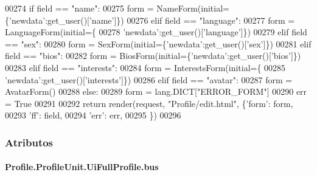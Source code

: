 \begin{DoxyCode}
00274                 \textcolor{keywordflow}{if}   field == \textcolor{stringliteral}{"name"}:
00275                     form = NameForm(initial=\{\textcolor{stringliteral}{'newdata'}:get\_user()[\textcolor{stringliteral}{'name'}]\})
00276                 \textcolor{keywordflow}{elif} field == \textcolor{stringliteral}{"language"}:
00277                     form = LanguageForm(initial=\{
00278                             \textcolor{stringliteral}{'newdata'}:get\_user()[\textcolor{stringliteral}{'language'}]\})
00279                 \textcolor{keywordflow}{elif} field == \textcolor{stringliteral}{"sex"}:
00280                     form = SexForm(initial=\{\textcolor{stringliteral}{'newdata'}:get\_user()[\textcolor{stringliteral}{'sex'}]\})
00281                 \textcolor{keywordflow}{elif} field == \textcolor{stringliteral}{"bios"}:
00282                     form = BiosForm(initial=\{\textcolor{stringliteral}{'newdata'}:get\_user()[\textcolor{stringliteral}{'bios'}]\})
00283                 \textcolor{keywordflow}{elif} field == \textcolor{stringliteral}{"interests"}:
00284                     form = InterestsForm(initial=\{
00285                             \textcolor{stringliteral}{'newdata'}:get\_user()[\textcolor{stringliteral}{'interests'}]\})
00286                 \textcolor{keywordflow}{elif} field == \textcolor{stringliteral}{"avatar"}:
00287                     form = AvatarForm()
00288                 \textcolor{keywordflow}{else}:
00289                     form = lang.DICT[\textcolor{stringliteral}{"ERROR\_FORM"}]
00290                     err = \textcolor{keyword}{True} 
00291 
00292                 \textcolor{keywordflow}{return} render(request, \textcolor{stringliteral}{"Profile/edit.html"}, \{\textcolor{stringliteral}{'form'}: form,
00293                                                              \textcolor{stringliteral}{'ff'}: field,
00294                                                              \textcolor{stringliteral}{'err'}: err,
00295                                                             \})
00296         

\end{DoxyCode}


\subsubsection{Atributos}
\hypertarget{classProfile_1_1ProfileUnit_1_1UiFullProfile_a47049f3f61c7fada93dd84fccd19a2bd}{
\paragraph[{bus}]{\setlength{\rightskip}{0pt plus 5cm}Profile.\-Profile\-Unit.\-Ui\-Full\-Profile.\-bus}}\label{classProfile_1_1ProfileUnit_1_1UiFullProfile_a47049f3f61c7fada93dd84fccd19a2bd}


